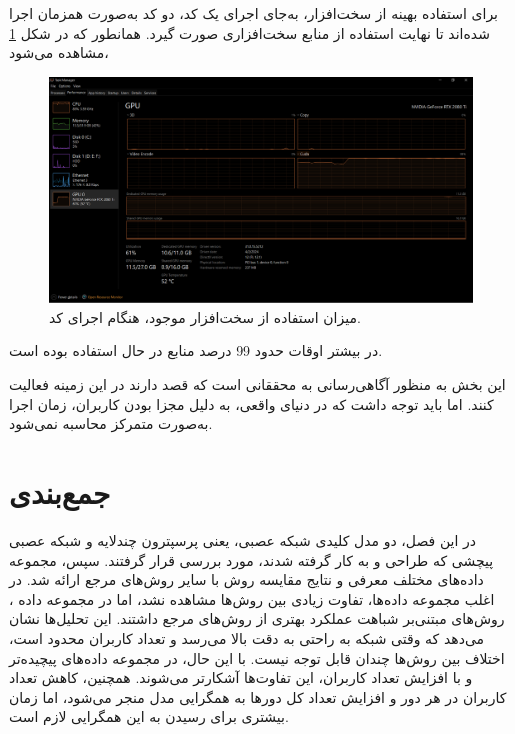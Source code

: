 برای استفاده بهینه از سخت‌افزار، به‌جای اجرای یک کد، دو کد به‌صورت همزمان اجرا شده‌اند تا نهایت استفاده از منابع سخت‌افزاری صورت گیرد. همانطور که در شکل
\ref{task_manager}
مشاهده می‌شود،
\begin{figure}[t!]
	\centering
	\includegraphics[scale=0.225]{images/chap5/task_manager_inverted_color.png}%
	\caption{%
		میزان استفاده از سخت‌افزار موجود، هنگام اجرای کد.
	}
	\label{task_manager}
	\centering
\end{figure}
در بیشتر اوقات حدود 99 درصد منابع
%
در حال استفاده بوده است.



این بخش به منظور آگاهی‌رسانی به محققانی است که قصد دارند در این زمینه فعالیت کنند. اما باید توجه داشت که در دنیای واقعی، به دلیل مجزا بودن کاربران، زمان اجرا به‌صورت متمرکز محاسبه نمی‌شود.


\section{جمع‌بندی}
در این فصل، دو مدل کلیدی شبکه عصبی، یعنی پرسپترون چندلایه
و شبکه عصبی پیچشی
که طراحی و به کار گرفته شدند، مورد بررسی قرار گرفتند. سپس، مجموعه داده‌های مختلف معرفی و نتایج مقایسه روش 
با سایر روش‌های مرجع ارائه شد. در اغلب مجموعه داده‌ها، تفاوت زیادی بین روش‌ها مشاهده نشد، اما در مجموعه داده 
%
، روش‌های مبتنی‌بر شباهت عملکرد بهتری از روش‌های مرجع داشتند. این تحلیل‌ها نشان می‌دهد که وقتی شبکه به راحتی به دقت بالا می‌رسد و تعداد کاربران محدود است، اختلاف بین روش‌ها چندان قابل توجه نیست. با این حال، در مجموعه داده‌های پیچیده‌تر و با افزایش تعداد کاربران، این تفاوت‌ها آشکارتر می‌شوند.
همچنین، کاهش تعداد کاربران در هر دور و افزایش تعداد کل دورها به همگرایی مدل منجر می‌شود، اما زمان بیشتری برای رسیدن به این همگرایی لازم است.
